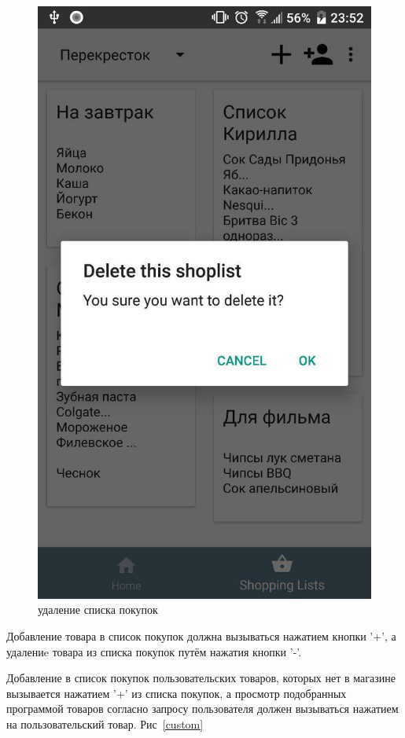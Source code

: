 \begin{figure}[h!]
    \includegraphics[height=0.38\textheight]{./screenshots/3/delete_shoplist.jpg}
    \caption{\small{удаление списка покупок}}
    \label{delete_sl}
    \endminipage{}
\end{figure}

Добавление товара в список покупок должна вызываться нажатием кнопки '+', а
удалениe товара из списка покупок путём нажатия кнопки '-'.

Добавление в список
покупок пользовательских товаров, которых нет в магазине вызывается нажатием
'+' из списка покупок, а просмотр подобранных программой товаров согласно
запросу пользователя должен вызываться нажатием на пользовательский товар.
Рис~\ref{custom}


